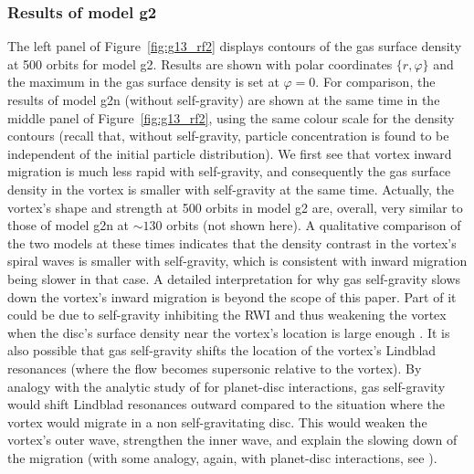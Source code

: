 \documentclass[a4paper,usenatbib]{mnras}
\begin{document}
\subsubsection{Results of model g2}
The left panel of Figure~\ref{fig:g13_rf2} displays contours of the
gas surface density at 500 orbits for model g2. Results are shown with
polar coordinates $\{r,\varphi\}$ and the maximum in the gas surface
density is set at $\varphi=0$. For comparison, the results of model
g2n (without self-gravity) are shown at the same time in the middle
panel of Figure~\ref{fig:g13_rf2}, using the same colour scale for the
density contours (recall that, without self-gravity, particle
concentration is found to be independent of the initial particle
distribution).  We first see that vortex inward migration is much less
rapid with self-gravity, and consequently the gas surface density in
the vortex is smaller with self-gravity at the same time.  Actually,
the vortex's shape and strength at 500 orbits in model g2 are,
overall, very similar to those of model g2n at $\sim$$130$ orbits (not
shown here). A qualitative comparison of the two models at these times
indicates that the density contrast in the vortex's spiral waves is
smaller with self-gravity, which is consistent with inward migration
being slower in that case. A detailed interpretation for why gas
self-gravity slows down the vortex's inward migration is beyond the
scope of this paper. Part of it could be due to self-gravity
inhibiting the RWI and thus weakening the vortex when the disc's
surface density near the vortex's location is large enough
\citep[][see also Paper I]{GN88}. It is also possible that gas
self-gravity shifts the location of the vortex's Lindblad resonances
(where the flow becomes supersonic relative to the vortex). By analogy
with the analytic study of \cite{PH05} for planet-disc interactions,
gas self-gravity would shift Lindblad resonances outward compared to
the situation where the vortex would migrate in a non self-gravitating
disc.  This would weaken the vortex's outer wave, strengthen the inner
wave, and explain the slowing down of the migration (with some
analogy, again, with planet-disc interactions, see \citealp{BM08b}).
\end{document}

